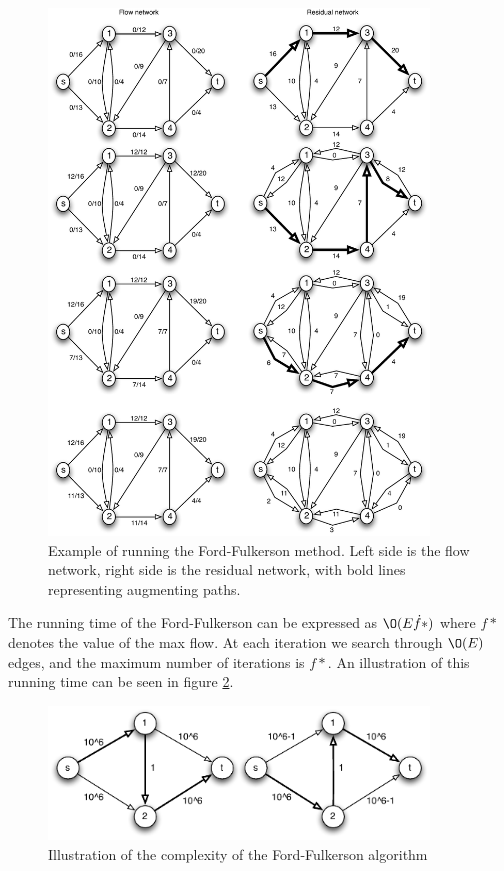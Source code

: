 \documentclass[10pt]{article}
\begin{document}
\begin{figure}[ht]
\centering
\includegraphics[width=0.9\textwidth]{figures/fig1.pdf}
\caption{Example of running the Ford-Fulkerson method. Left side is the flow network, right side is the residual network, with bold lines representing augmenting paths.}
\label{fig1}
\end{figure}

The running time of the Ford-Fulkerson can be expressed as $\O(E\dot f*)$ where $f*$ denotes the value of the max flow. At each iteration we search through $\O(E)$ edges, and the maximum number of iterations is $f*$. An illustration of this running time can be seen in figure \ref{fig2}.

\begin{figure}[ht]
\centering
\includegraphics[width=0.9\textwidth]{figures/fig2.pdf}
\caption{Illustration of the complexity of the Ford-Fulkerson algorithm}
\label{fig2}
\end{figure}
\end{document}

